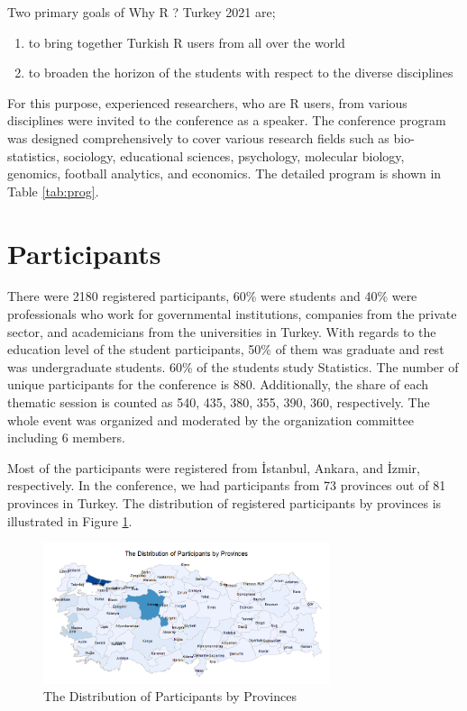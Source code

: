 Two primary goals of Why R ? Turkey 2021 are; 

\begin{enumerate}
    \item to bring together Turkish R users from all over the world
    \item to broaden the horizon of the students with respect to the diverse disciplines
\end{enumerate}


For this purpose, experienced researchers, who are R users, from various disciplines were invited to the conference as a speaker.  The conference program was designed comprehensively to cover various research fields such as bio-statistics, sociology, educational sciences, psychology, molecular biology, genomics, football analytics, and economics. The detailed program is shown in Table \ref{tab:prog}. 

\section{Participants}

There were 2180 registered participants, 60\% were students and 40\% were professionals who work for governmental institutions, companies from the private sector, and academicians from the universities in Turkey. With regards to the education level of the student participants, 50\% of them was graduate and rest was undergraduate students. 60\% of the students study Statistics. The number of unique participants for the conference is 880. Additionally, the share of each thematic session is counted as 540, 435, 380, 355, 390, 360, respectively. The whole event was organized and moderated by the organization committee including 6 members.

Most of the participants were registered from İstanbul, Ankara, and İzmir, respectively. In the conference, we had participants from 73 provinces out of 81 provinces in Turkey. The distribution of registered participants by provinces is illustrated in Figure \ref{fig2}. 

\begin{figure}[!h]
    \centering
    \includegraphics[width=0.75\textwidth]{whyr_map.png}
    \caption{The Distribution of Participants by Provinces}
    \label{fig2}
\end{figure}

